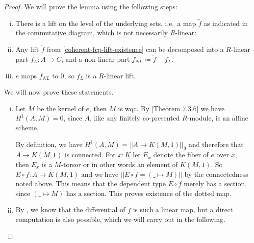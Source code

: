 \begin{proof}
  We will prove the lemma using the following steps:
  \begin{enumerate}[(i)]
  \item \label{coherent-fcp-lift-existence} There is a lift on the level of the underlying sets, i.e.\ a map $\tilde{f}$ as indicated in the commutative diagram, which is not necessarily $R$-linear:
    \begin{center}
    \end{center}
  \item Any lift $\tilde{f}$ from \ref{coherent-fcp-lift-existence} can be decomposed into a $R$-linear part $f_L:A\to C$, and a non-linear part $f_{NL}\coloneq\tilde{f}-f_L$.
  \item $e$ maps $f_{NL}$ to $0$, so $f_L$ is a $R$-linear lift.
  \end{enumerate}
  We will now prove these statements.
  \begin{enumerate}[(i)]
  \item Let $M$ be the kernel of $e$, then $M$ is wqc.
  By \cite{draft}[Theorem 7.3.6] we have $H^1(A,M)=0$, since $A$, like any finitely co-presented $R$-module, is an affine scheme.

  By definition, we have $H^1(A,M)=||A\to K(M,1)||_0$ and therefore that $A\to K(M,1)$ is connected.
  For $x:K$ let $E_x$ denote the fiber of $e$ over $x$, then $E_x$ is a $M$-torsor or in other words an element of $K(M,1)$.
  So $E\circ f:A\to K(M,1)$ and we have $|| E\circ f = (\_\mapsto M) ||$ by the connectedness noted above.
  This means that the dependent type $E\circ f$ merely has a section, since $(\_\mapsto M)$ has a section.
  This proves existence of the dotted map.
  \item By \cite{diffgeo-article}, we know that the differential of $\tilde{f}$ is such a linear map,
  but a direct computation is also possible, which we will carry out in the following.


\end{enumerate}
\end{proof}

